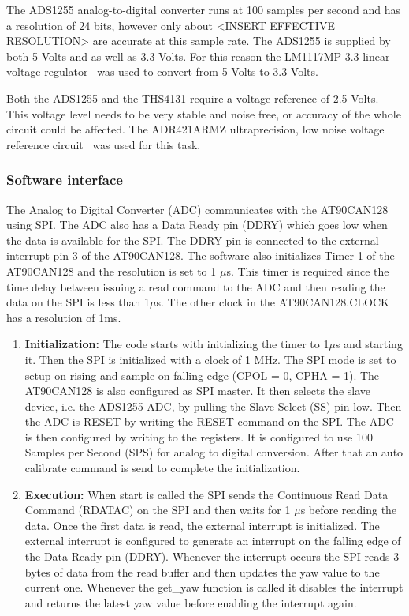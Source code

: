 The ADS1255 analog-to-digital converter runs at 100 samples per second and has a resolution of 24 bits, however only about <INSERT EFFECTIVE RESOLUTION> are accurate at this sample rate. \newline
The ADS1255 is supplied by both 5 Volts and as well as 3.3 Volts. For this reason the LM1117MP-3.3 linear voltage regulator~\cite{web:lm1117} was used to convert from 5 Volts to 3.3 Volts. 

Both the ADS1255 and the THS4131 require a voltage reference of 2.5 Volts. This voltage level needs to be very stable and noise free, or accuracy of the whole circuit could be affected. The ADR421ARMZ ultraprecision, low noise voltage reference circuit~\cite{web:adr421} was used for this task.

\subsubsection{Software interface}
The Analog to Digital Converter (ADC) communicates with the AT90CAN128 using SPI. The ADC also has a Data Ready pin (DDRY) which goes low when the data is available for the SPI. The DDRY pin is connected to the external interrupt pin 3 of the AT90CAN128. The software also initializes Timer 1 of the AT90CAN128 and the resolution is set to 1 $\mu$s. This timer is required since the time delay between issuing a read command to the ADC and then reading the data on the SPI is less than 1$\mu$s. The other clock in the AT90CAN128.CLOCK has a resolution of 1ms.
\begin{enumerate}
\item \textbf{Initialization:} The code starts with initializing the timer to 1$\mu$s and starting it. Then the SPI is initialized with a clock of 1 MHz. The SPI mode is set to setup on rising and sample on falling edge (CPOL = 0, CPHA = 1). The AT90CAN128 is also configured as SPI master. It then selects the slave device, i.e. the ADS1255 ADC, by pulling  the Slave Select (SS) pin low. Then the ADC is RESET by writing the RESET command on the SPI. The ADC is then configured by writing to the registers. It is configured to use 100 Samples per Second (SPS) for analog to digital conversion. After that an auto calibrate command is send to complete the initialization. 

\item \textbf{Execution:} When start is called the SPI sends the Continuous Read Data Command (RDATAC) on the SPI and then waits for 1 $\mu$s before reading the data. Once the first data is read, the external interrupt is initialized. The external interrupt is configured to generate an interrupt on the falling edge of the Data Ready pin (DDRY). Whenever the interrupt occurs the SPI reads 3 bytes of data from the read buffer and then updates the yaw value to the current one. Whenever the get\_yaw function is called it disables the interrupt and returns the latest yaw value before enabling the interrupt again.
\end{enumerate}
